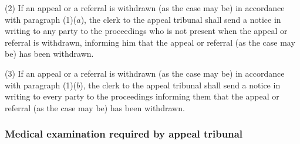 \documentclass[12pt,a4paper]{article}
\begin{document}
(2) If an appeal or a referral is withdrawn (as the case may be) in accordance with paragraph (1)($a$), the clerk to the appeal tribunal shall send a notice in writing to any party to the proceedings who is not present when the appeal or referral is withdrawn, informing him that the appeal or referral (as the case may be) has been withdrawn.

(3) If an appeal or a referral is withdrawn (as the case may be) in accordance with paragraph (1)($b$), the clerk to the appeal tribunal shall send a notice in writing to every party to the proceedings informing them that the appeal or referral (as the case may be) has been withdrawn.


\subsubsection[41. Medical examination required by appeal tribunal]
{Medical examination required by appeal tribunal}
\end{document}
